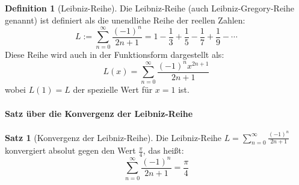 \documentclass[a4paper,12pt,twoside]{report}
\theoremstyle{definition}
\newtheorem{definition}{Definition}
\newtheorem{satz}{Satz}
\begin{document}
\begin{definition}[Leibniz-Reihe]
Die Leibniz-Reihe (auch Leibniz-Gregory-Reihe genannt) ist definiert als die unendliche Reihe der reellen Zahlen:
\begin{equation}
L := \sum_{n=0}^{\infty} \frac{(-1)^n}{2n+1} = 1 - \frac{1}{3} + \frac{1}{5} - \frac{1}{7} + \frac{1}{9} - \cdots
\end{equation}
Diese Reihe wird auch in der Funktionsform dargestellt als:
\begin{equation}
L(x) = \sum_{n=0}^{\infty} \frac{(-1)^n x^{2n+1}}{2n+1}
\end{equation}
wobei $L(1) = L$ der spezielle Wert für $x=1$ ist.
\end{definition}

\paragraph{Satz über die Konvergenz der Leibniz-Reihe}

\begin{satz}[Konvergenz der Leibniz-Reihe]
Die Leibniz-Reihe $L = \sum_{n=0}^{\infty} \frac{(-1)^n}{2n+1}$ konvergiert absolut gegen den Wert $\frac{\pi}{4}$, das heißt:
\begin{equation}
\sum_{n=0}^{\infty} \frac{(-1)^n}{2n+1} = \frac{\pi}{4}
\end{equation}
\end{satz}
\end{document}

